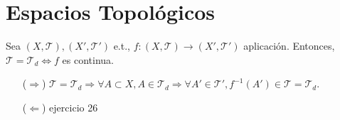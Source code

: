 \section{Espacios Topológicos}

\begin{ejr}[27]
  Sea $( X, \mathcal{T} ), ( X', \mathcal{T}' )$ e.t., $f: ( X, \mathcal{T} ) \to ( X', \mathcal{T}' )$ aplicación. Entonces, $\mathcal{T} = \mathcal{T}_{d} \Leftrightarrow f$ es continua.
\end{ejr}

\begin{sol}
  \begin{enumerate}[label=(\roman*)]
    \item []
    \item [($\Rightarrow$)] $\mathcal{T} = \mathcal{T}_{d} \Rightarrow \forall A \subset X, A \in \mathcal{T}_{d} \Rightarrow \forall A' \in \mathcal{T}', f^{-1}(A') \in \mathcal{T} = \mathcal{T}_{d}$.
    \item [($\Leftarrow$)] ejercicio 26
  \end{enumerate}
\end{sol}
